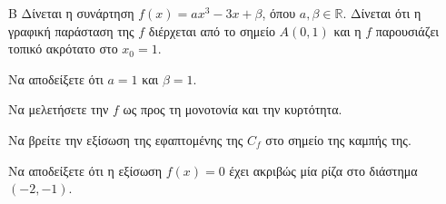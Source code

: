 \begin{thema}{Β}
Δίνεται η συνάρτηση $f(x) = a x^3 - 3x + \beta$, όπου $a, \beta \in \mathbb{R}$. Δίνεται ότι η γραφική παράσταση της $f$ διέρχεται από το σημείο $A(0, 1)$ και η $f$ παρουσιάζει τοπικό ακρότατο στο $x_0 = 1$.
\begin{erwthma}
\item Να αποδείξετε ότι $a=1$ και $\beta=1$.
\item Να μελετήσετε την $f$ ως προς τη μονοτονία και την κυρτότητα.
\item Να βρείτε την εξίσωση της εφαπτομένης της $C_f$ στο σημείο της καμπής της.
\item Να αποδείξετε ότι η εξίσωση $f(x) = 0$ έχει ακριβώς μία ρίζα στο διάστημα $(-2, -1)$.
\end{erwthma}
\end{thema}
